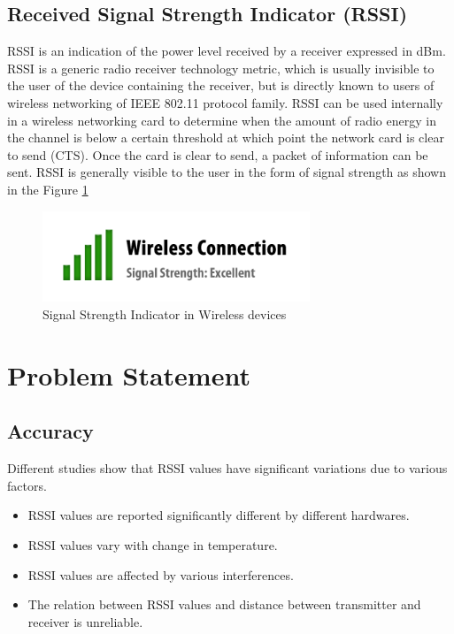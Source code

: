 \documentclass[11pt,a4paper,headinclude,footinclude,chapterprefix=on]{scrreprt}
\begin{document}
\section{Received Signal Strength Indicator (RSSI)} RSSI is an indication of the power level received by a receiver expressed in dBm. RSSI is a generic radio receiver technology metric, which is usually invisible to the user of the device containing the receiver, but is directly known to users of wireless networking of IEEE 802.11 protocol family. RSSI can be used internally in a wireless networking card to determine when the amount of radio energy in the channel is below a certain threshold at which point the network card is clear to send (CTS). Once the card is clear to send, a packet of information can be sent. RSSI is generally visible to the user in the form of signal strength as shown in the Figure \ref{fig:rssi} 

\begin{figure}
	[!h] \centering 
	\includegraphics[width=8cm]{Images/rssi.png} \caption{Signal Strength Indicator in Wireless devices } \label{fig:rssi} 
\end{figure}

\chapter{Problem Statement}
\section{Accuracy}
Different studies show that RSSI values have significant variations due to various factors.
\begin{itemize}
\item RSSI values are reported significantly different by different hardwares.
\item RSSI values vary with change in temperature.
\item RSSI values are affected by various interferences.
\item The relation between RSSI values and distance between
transmitter and receiver is unreliable.
\end{itemize}
\end{document}
